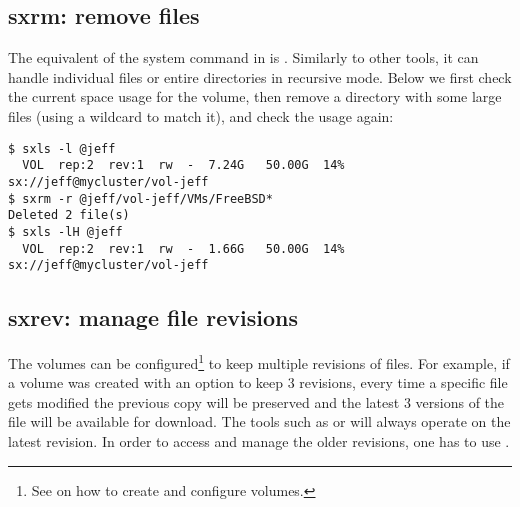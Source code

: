 \subsection{sxrm: remove files}
The equivalent of the system command  in \SX is . Similarly
to other tools, it can handle individual files or entire directories in
recursive mode. Below we first check the current space usage for the volume, then
remove a directory with some large files (using a wildcard to match it), and check
the usage again:
\begin{lstlisting}
$ sxls -l @jeff
  VOL  rep:2  rev:1  rw  -  7.24G   50.00G  14% sx://jeff@mycluster/vol-jeff
$ sxrm -r @jeff/vol-jeff/VMs/FreeBSD*
Deleted 2 file(s)
$ sxls -lH @jeff
  VOL  rep:2  rev:1  rw  -  1.66G   50.00G  14% sx://jeff@mycluster/vol-jeff
\end{lstlisting}

\subsection{sxrev: manage file revisions}
The \SX volumes can be configured\footnote{See  on how
to create and configure volumes.} to keep multiple revisions of files. For
example, if a volume was created with an option to keep 3 revisions, every
time a specific file gets modified the previous copy will be preserved and
the latest 3 versions of the file will be available for download. The tools
such as  or  will always operate on the latest revision.
In order to access and manage the older revisions, one has to use .


